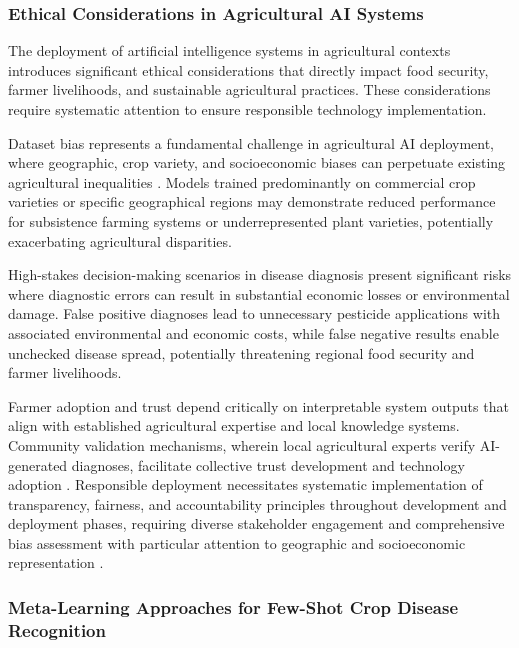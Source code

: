 \documentclass[sn-mathphys]{sn-jnl}
\theoremstyle{thmstyleone}%
\theoremstyle{thmstyletwo}%
\theoremstyle{thmstylethree}%
\begin{document}
\subsubsection{Ethical Considerations in Agricultural AI Systems}

The deployment of artificial intelligence systems in agricultural contexts introduces significant ethical considerations that directly impact food security, farmer livelihoods, and sustainable agricultural practices. These considerations require systematic attention to ensure responsible technology implementation.

Dataset bias represents a fundamental challenge in agricultural AI deployment, where geographic, crop variety, and socioeconomic biases can perpetuate existing agricultural inequalities \citep{mehrabi2021survey}. Models trained predominantly on commercial crop varieties or specific geographical regions may demonstrate reduced performance for subsistence farming systems or underrepresented plant varieties, potentially exacerbating agricultural disparities.

High-stakes decision-making scenarios in disease diagnosis present significant risks where diagnostic errors can result in substantial economic losses or environmental damage. False positive diagnoses lead to unnecessary pesticide applications with associated environmental and economic costs, while false negative results enable unchecked disease spread, potentially threatening regional food security and farmer livelihoods.

Farmer adoption and trust depend critically on interpretable system outputs that align with established agricultural expertise and local knowledge systems. Community validation mechanisms, wherein local agricultural experts verify AI-generated diagnoses, facilitate collective trust development and technology adoption \citep{rahwan2019machine}. Responsible deployment necessitates systematic implementation of transparency, fairness, and accountability principles throughout development and deployment phases, requiring diverse stakeholder engagement and comprehensive bias assessment with particular attention to geographic and socioeconomic representation \citep{jobin2019artificial}.


\subsubsection{Meta-Learning Approaches for Few-Shot Crop Disease Recognition}
\end{document}
